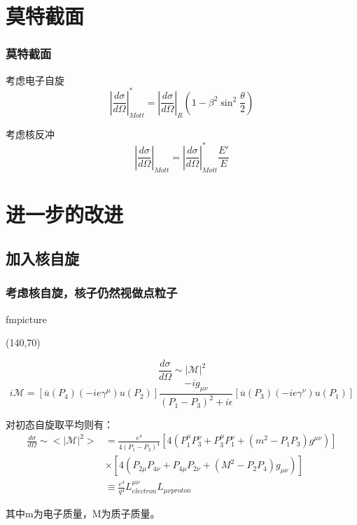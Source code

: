 \documentclass[slidestop, compress, red]{beamer}
\begin{document}
\section{莫特截面}
\begin{frame}
	\frametitle{莫特截面}
	\begin{block}{考虑电子自旋}
		\begin{equation}
			|\frac{d\sigma}{d\Omega}|^*_{Mott} = |\frac{d\sigma}{d\Omega}|_R(1-\beta^2\sin^2\frac{\theta}{2})
		\end{equation}
	\end{block}
	\begin{block}{考虑核反冲}
		\begin{equation}
			|\frac{d\sigma}{d\Omega}|_{Mott} = |\frac{d\sigma}{d\Omega}|^*_{Mott}\frac{E'}{E}
		\end{equation}
	\end{block}
\end{frame}

\section{进一步的改进}
\subsection{加入核自旋}
\begin{frame}
	\frametitle{考虑核自旋，核子仍然视做点粒子}
	\begin{center}
	\begin{fmffile}{fmpicture}
	\begin{fmfgraph*}(140,70)
	\end{fmfgraph*}
	\end{fmffile}
	\end{center}
	\begin{equation}
		\frac{d\sigma}{d\Omega} \sim |\mathcal{M}|^2
	\end{equation}
	\begin{equation}
		i\mathcal{M}=[\overline u (P_4)(-ie\gamma^\mu)u(P_2)]\frac{-ig_{\mu\nu}}{(P_1-P_3)^2+i\epsilon}[\overline u(P_3)(-ie\gamma^\nu)u(P_1)]
	\end{equation}
\end{frame}

\begin{frame}
对初态自旋取平均则有：
\begin{equation}
	\begin{split}
	\frac{d\sigma}{d\Omega}\sim<|\mathcal{M}|^2>&=\frac{e^4}{4(P_1-P_3)^4}[4(P^\mu_1P^\nu_3+P^\mu_3P^\nu_1+(m^2-P_1P_3)g^{\mu\nu})]\\
	&\times[4(P_{2\mu}P_{4\nu}+P_{4\mu}P_{2\nu}+(M^2-P_2P_4)g_{\mu\nu})]\\
	&\equiv\frac{e^4}{q^4}L^{\mu\nu}_{electron}L_{\mu\nu proton}
	\end{split}
\end{equation}

其中m为电子质量，M为质子质量。
\end{frame}
\end{document}
